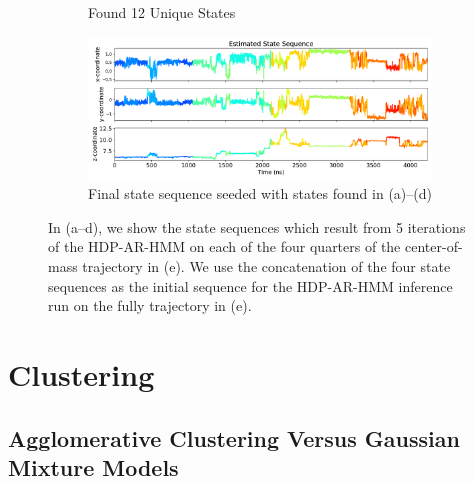 \documentclass{article}
\begin{document}
\begin{figure}
\begin{subfigure}{0.48\textwidth}
  \caption{Found 12 Unique States}\label{fig:segment4}
  \end{subfigure}
  \begin{subfigure}{1\textwidth}
  \includegraphics[width=\textwidth]{seed_ACH21_full.pdf}
  \caption{Final state sequence seeded with states found in (a)--(d)}\label{fig:full}
  \end{subfigure}
  \caption{In (a--d), we show the state sequences which result from 5 iterations
  of the HDP-AR-HMM on each of the four quarters of the center-of-mass trajectory
  in (e). We use the concatenation of the four state sequences as the initial 
  sequence for the HDP-AR-HMM inference run on the fully trajectory in (e).
  }\label{fig:seed_sequence}
  \end{figure}
  
  \section{Clustering}\label{section:clustering}
  
  \subsection{Agglomerative Clustering Versus Gaussian Mixture Models}\label{section:agglomerative}
  
\end{document}

